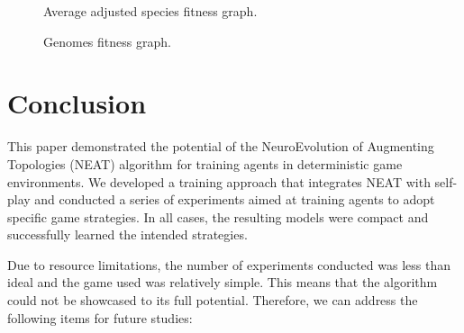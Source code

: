 \documentclass[letterpaper, 12pt]{article}
\begin{document}
\begin{figure}[H]
  \centering
  
  \caption{Average adjusted species fitness graph.}
  \label{fig:species_fit_def}
\end{figure}

\begin{figure}[H]
  \centering
  
  \caption{Genomes fitness graph.}
\end{figure}

\section{Conclusion}
This paper demonstrated the potential of the NeuroEvolution of Augmenting Topologies
(NEAT) algorithm for training agents in deterministic game environments. We developed a
training approach that integrates NEAT with self-play and conducted a series of
experiments aimed at training agents to adopt specific game strategies. In all cases,
the resulting models were compact and successfully learned the intended strategies.

Due to resource limitations, the number of experiments conducted was less than ideal and
the game used was relatively simple. This means that the algorithm could not be
showcased to its full potential. Therefore, we can address the following items for
future studies:
\end{document}
